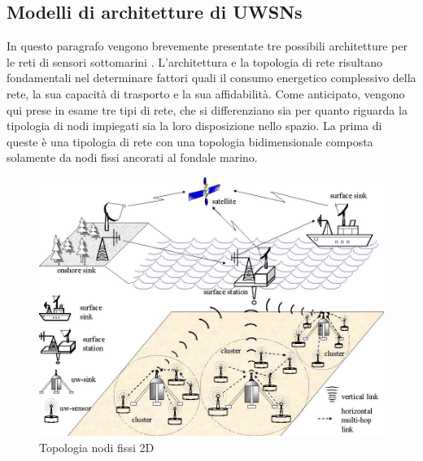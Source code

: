 \documentclass[Lau,binding=0.6cm]{sapthesis}
\begin{document}
\subsection{Modelli di architetture di UWSNs}
In questo paragrafo vengono brevemente presentate tre possibili architetture per le reti di sensori sottomarini \cite{underwater}. L'architettura e la topologia di rete risultano fondamentali nel determinare fattori quali il consumo energetico complessivo della rete, la sua capacità di trasporto e la sua affidabilità. \newline Come anticipato, vengono qui prese in esame tre tipi di rete, che si differenziano sia per quanto riguarda la tipologia di nodi impiegati sia la loro disposizione nello spazio.  La prima di queste è una tipologia di rete con una topologia bidimensionale composta solamente da nodi fissi ancorati al fondale marino.

\begin{figure}[H]
    \centering
	\includegraphics[scale=0.3]{2D_arch.jpg}
	\caption{ Topologia nodi fissi 2D}
	\label{fig:}
\end{figure}
\end{document}
